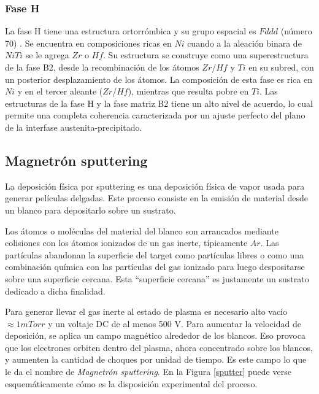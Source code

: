 \documentclass[12pt]{article}
\theoremstyle{definition}
\theoremstyle{remark}
\begin{document}
\subsubsection{Fase H}
La fase H tiene una estructura ortorrómbica y su grupo espacial es $Fddd$ (número 70) \citep{Yang2013} \citep{Santamarta2013}. Se encuentra en composiciones ricas en $Ni$ cuando a la aleación binara de $NiTi$ se le agrega $Zr$ o $Hf$. Su estructura se construye como una superestructura de la fase B2, desde la recombinación de los átomos $Zr$/$Hf$ y $Ti$ en su subred, con un posterior desplazamiento de los átomos\citep{Evirgen2018}. La composición de esta fase es rica en $Ni$ y en el tercer aleante ($Zr$/$Hf$), mientras que resulta pobre en $Ti$. Las estructuras de la fase H y la fase matriz B2 tiene un alto nivel de acuerdo, lo cual permite una completa coherencia caracterizada por un ajuste perfecto del plano de la interfase austenita-precipitado\citep{Evirgen2018}.


\subsection{Magnetrón sputtering}
La deposición física por sputtering es una deposición física de vapor usada para generar películas delgadas. Este proceso consiste en la emisión de material desde un blanco para depositarlo sobre un sustrato. 

 Los átomos o moléculas del material del blanco son arrancados mediante colisiones con los átomos ionizados de un gas inerte, típicamente $Ar$. Las partículas abandonan la superficie del target como partículas libres o como una combinación química con las partículas del gas ionizado para luego despositarse sobre una superficie cercana.  Esta ``superficie cercana'' es justamente un sustrato dedicado a dicha finalidad.
 
Para generar llevar el gas inerte al estado de plasma es necesario alto vacío $\approx 1 mTorr$ y un voltaje DC de al menos 500 V. Para aumentar la velocidad de deposición, se aplica un campo magnético alrededor de los blancos. Eso provoca que los electrones orbiten dentro del plasma, ahora concentrado sobre los blancos, y aumenten la cantidad de choques por unidad de tiempo. Es este campo lo que le da el nombre de \textit{Magnetrón sputtering}\citep{Malvasio}\citep{ThinFilm}. En la Figura \ref{sputter} puede verse esquemáticamente cómo es la disposición experimental del proceso.
\end{document}
